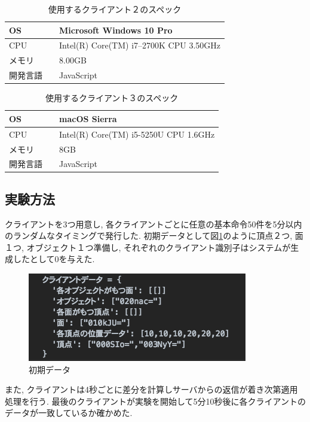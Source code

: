 \begin{table}[]
\begin{center}
	\caption{使用するクライアント２のスペック}
	\begin{tabular}{|l|l|} \hline
		OS & Microsoft Windows 10 Pro \\ \hline
		CPU & Intel(R) Core(TM) i7--2700K CPU 3.50GHz \\ \hline
		メモリ & 8.00GB \\ \hline
    開発言語　& JavaScript \\ \hline
	\end{tabular}
	\label{1_client2}
\end{center}
\end{table}
\begin{table}[]
\begin{center}
	\caption{使用するクライアント３のスペック}
	\begin{tabular}{|l|l|} \hline
		OS & macOS Sierra \\ \hline
		CPU & Intel(R) Core(TM) i5-5250U CPU 1.6GHz \\ \hline
		メモリ & 8GB \\ \hline
    開発言語　& JavaScript \\ \hline
	\end{tabular}
	\label{1_client3}
\end{center}
\end{table}
\subsection{実験方法}
クライアントを3つ用意し, 各クライアントごとに任意の基本命令50件を5分以内のランダムなタイミングで発行した. 初期データとして図\ref{init}のように頂点２つ, 面１つ, オブジェクト１つ準備し, それぞれのクライアント識別子はシステムが生成したとして0を与えた.
\begin{figure}[]
 \begin{center}
	 \includegraphics[scale=0.6]{images/init}
	 \caption{初期データ}
	 \label{init}
 \end{center}
\end{figure}
また, クライアントは4秒ごとに差分を計算しサーバからの返信が着き次第適用処理を行う. 最後のクライアントが実験を開始して5分10秒後に各クライアントのデータが一致しているか確かめた.
